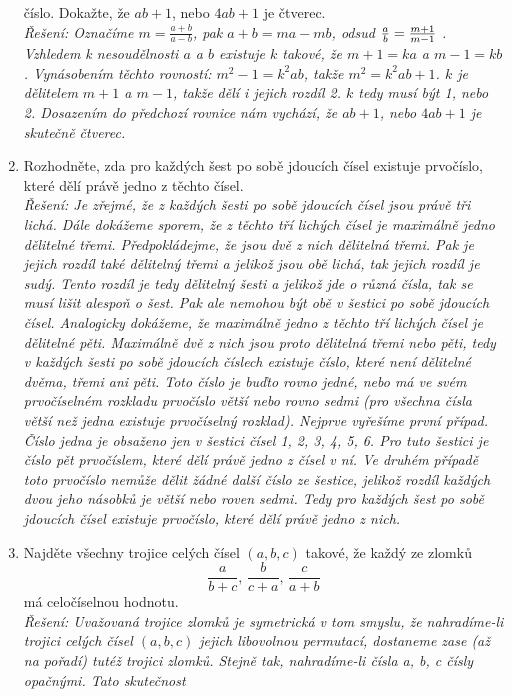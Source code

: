 \documentclass[12pt,a4paper]{report}
\begin{document}
\begin{enumerate}
	číslo. Dokažte, že $ab + 1$, nebo $4ab + 1$ je čtverec.
	\\ \textit{Řešení: Označíme $m=\frac{a+b}{a-b}$, pak $a+b = ma-mb$, odsud ${a \over b} = {m+1\over m-1}$ . Vzhledem k nesoudělnosti $a$ a $b$ existuje $k$ takové, že $m + 1 = ka$ a $m - 1 = kb$. Vynásobením těchto rovností: $m^2 - 1 = k^2ab$, takže $m^2 = k^2ab + 1$. $k$ je dělitelem $m + 1$ a $m - 1$, takže dělí i jejich rozdíl 2. $k$ tedy musí být 1, nebo 2. Dosazením do předchozí rovnice nám vychází, že $ab + 1$, nebo $4ab + 1$ je skutečně čtverec.}
	\item Rozhodněte, zda pro každých šest po sobě jdoucích čísel existuje prvočíslo, které dělí právě jedno
	z těchto čísel.	
	\\ \textit {Řešení: Je zřejmé, že z každých šesti po sobě jdoucích čísel jsou právě tři lichá. Dále dokážeme sporem, že
		z těchto tří lichých čísel je maximálně jedno dělitelné třemi. Předpokládejme, že jsou dvě z nich
		dělitelná třemi. Pak je jejich rozdíl také dělitelný třemi a jelikož jsou obě lichá, tak jejich rozdíl je
		sudý. Tento rozdíl je tedy dělitelný šesti a jelikož jde o různá čísla, tak se musí lišit alespoň o šest.
		Pak ale nemohou být obě v šestici po sobě jdoucích čísel.
		Analogicky dokážeme, že maximálně jedno z těchto tří lichých čísel je dělitelné pěti. Maximálně
		dvě z nich jsou proto dělitelná třemi nebo pěti, tedy v každých šesti po sobě jdoucích číslech existuje
		číslo, které není dělitelné dvěma, třemi ani pěti. Toto číslo je buďto rovno jedné, nebo má ve svém
		prvočíselném rozkladu prvočíslo větší nebo rovno sedmi (pro všechna čísla větší než jedna existuje
		prvočíselný rozklad). Nejprve vyřešíme první případ. Číslo jedna je obsaženo jen v šestici čísel 1,
		2, 3, 4, 5, 6. Pro tuto šestici je číslo pět prvočíslem, které dělí právě jedno z čísel v ní. Ve druhém
		případě toto prvočíslo nemůže dělit žádné další číslo ze šestice, jelikož rozdíl každých dvou jeho
		násobků je větší nebo roven sedmi.
		Tedy pro každých šest po sobě jdoucích čísel existuje prvočíslo, které dělí právě jedno z nich.
	}
	\item Najděte všechny trojice celých čísel $(a, b, c)$ takové, že každý ze zlomků
	$$\frac{a}{b+c},\,\frac{b}{c+a},\,\frac{c}{a+b}$$ má celočíselnou hodnotu.
	\\ \textit{Řešení: Uvažovaná trojice zlomků je symetrická v tom smyslu, že nahradíme-li trojici
		celých čísel $(a, b, c)$ jejich libovolnou permutací, dostaneme zase (až na pořadí) tutéž
		trojici zlomků. Stejně tak, nahradíme-li čísla a, b, c čísly opačnými. Tato skutečnost
}
\end{enumerate}
\end{document}
